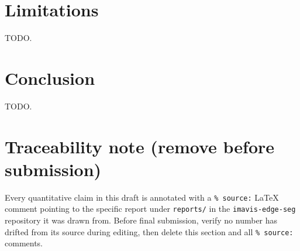 \documentclass[a4paper,review,12pt]{elsarticle}
\begin{document}
\section{Limitations}
\label{sec:limitations}
TODO.

\section{Conclusion}
\label{sec:conclusion}
TODO.

\section*{Traceability note (remove before submission)}
Every quantitative claim in this draft is annotated with a \texttt{\% source:}
LaTeX comment pointing to the specific report under \texttt{reports/} in the
\texttt{imavis-edge-seg} repository it was drawn from. Before final
submission, verify no number has drifted from its source during editing, then
delete this section and all \texttt{\% source:} comments.
\end{document}
